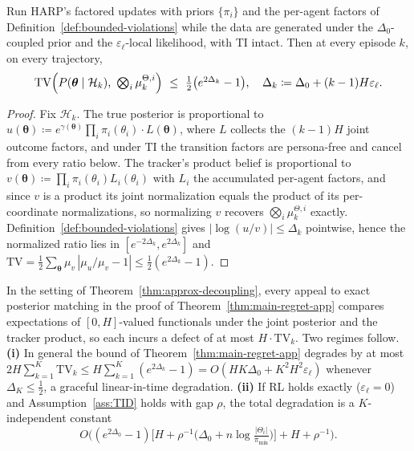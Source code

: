 \begin{theorem}
\label{thm:approx-decoupling}
Run HARP's factored updates with priors $\{\pi_i\}$ and the per-agent factors of Definition~\ref{def:bounded-violations} while the data are generated under the $\Delta_0$-coupled prior and the $\varepsilon_\ell$-local likelihood, with TI intact. Then at every episode $k$, on every trajectory,
\begin{equation*}\resizebox{0.9\linewidth}{!}{$\displaystyle
\mathrm{TV}\Big(P(\boldsymbol\theta\mid\mathcal H_k),\ \textstyle\bigotimes_i\mu_k^{\Theta,i}\Big)\ \le\ \tfrac12\big(e^{2\Delta_k}-1\big),
\quad \Delta_k\coloneqq\Delta_0+(k-1)H\varepsilon_\ell. $}
\end{equation*}
\end{theorem}

\begin{proof}
Fix $\mathcal H_k$. The true posterior is proportional to $u(\boldsymbol\theta)\coloneqq e^{\gamma(\boldsymbol\theta)}\prod_i\pi_i(\theta_i)\cdot L(\boldsymbol\theta)$, where $L$ collects the $(k-1)H$ joint outcome factors, and under TI the transition factors are persona-free and cancel from every ratio below. The tracker's product belief is proportional to $v(\boldsymbol\theta)\coloneqq\prod_i\pi_i(\theta_i)L_i(\theta_i)$ with $L_i$ the accumulated per-agent factors, and since $v$ is a product its joint normalization equals the product of its per-coordinate normalizations, so normalizing $v$ recovers $\bigotimes_i\mu_k^{\Theta,i}$ exactly. Definition~\ref{def:bounded-violations} gives $|\log(u/v)|\le\Delta_k$ pointwise, hence the normalized ratio lies in $[e^{-2\Delta_k},e^{2\Delta_k}]$ and $\mathrm{TV}=\tfrac12\sum_{\boldsymbol\theta}\mu_v\,|\mu_u/\mu_v-1|\le\tfrac12(e^{2\Delta_k}-1)$.
\end{proof}

\begin{corollary}
\label{cor:pf-constant}
In the setting of Theorem~\ref{thm:approx-decoupling}, every appeal to exact posterior matching in the proof of Theorem~\ref{thm:main-regret-app} compares expectations of $[0,H]$-valued functionals under the joint posterior and the tracker product, so each incurs a defect of at most $H\cdot\mathrm{TV}_k$. Two regimes follow.
\textbf{(i)} In general the bound of Theorem~\ref{thm:main-regret-app} degrades by at most $2H\sum_{k=1}^K\mathrm{TV}_k\le H\sum_{k=1}^K(e^{2\Delta_k}-1)=O(HK\Delta_0+K^2H^2\varepsilon_\ell)$ whenever $\Delta_K\le\tfrac12$, a graceful linear-in-time degradation.
\textbf{(ii)} If RL holds exactly ($\varepsilon_\ell=0$) and Assumption~\ref{ass:TID} holds with gap $\rho$, the total degradation is a $K$-independent constant
\begin{equation*}
O\Big((e^{2\Delta_0}-1)\big[H+\rho^{-1}\big(\Delta_0+n\log\tfrac{|\Theta_i|}{\pi_{\min}}\big)\big]+H+\rho^{-1}\Big).
\end{equation*}
\end{corollary}

